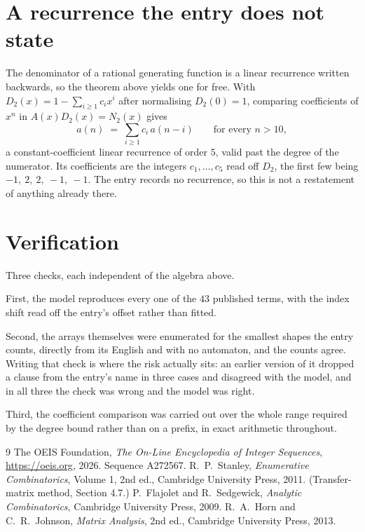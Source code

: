 \documentclass[11pt,a4paper]{article}
\theoremstyle{plain}
\theoremstyle{definition}
\begin{document}
\section{A recurrence the entry does not state}

The denominator of a rational generating function is a linear recurrence written backwards, so
the theorem above yields one for free. With $D_2(x)=1-\sum_{i\ge1}c_ix^i$ after normalising
$D_2(0)=1$, comparing coefficients of $x^n$ in $A(x)D_2(x)=N_2(x)$ gives
\[
a(n)\;=\;\sum_{i\ge1}c_i\,a(n-i)\qquad\text{for every }n>10,
\]
a constant-coefficient linear recurrence of order $5$, valid past the degree of the
numerator. Its coefficients are the integers $c_1,\dots,c_{5}$ read off $D_2$, the first few being $-1,\ 2,\ 2,\ -1,\ -1$. The entry records no recurrence, so this is not a restatement of anything
already there.

\section{Verification}

Three checks, each independent of the algebra above.

First, the model reproduces every one of the $43$ published terms, with the index shift
read off the entry's offset rather than fitted.

Second, the arrays themselves were enumerated for the smallest shapes the entry counts,
directly from its English and with no automaton, and the counts agree. Writing that check is
where the risk actually sits: an earlier version of it dropped a clause from the entry's name
in three cases and disagreed with the model, and in all three the check was wrong and the model
was right.

Third, the coefficient comparison was carried out over the whole range required by the degree
bound rather than on a prefix, in exact arithmetic throughout.

\begin{thebibliography}{9}
 The OEIS Foundation, \emph{The On-Line Encyclopedia of Integer
Sequences}, \url{https://oeis.org}, 2026. Sequence A272567.
 R.~P.~Stanley, \emph{Enumerative Combinatorics}, Volume 1, 2nd ed.,
Cambridge University Press, 2011. (Transfer-matrix method, Section 4.7.)
 P.~Flajolet and R.~Sedgewick, \emph{Analytic Combinatorics}, Cambridge
University Press, 2009.
 R.~A.~Horn and C.~R.~Johnson, \emph{Matrix Analysis}, 2nd ed., Cambridge
University Press, 2013.
\end{thebibliography}
\end{document}
